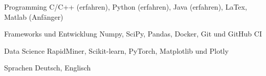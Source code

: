 

\begin{cvskills}

  \cvskill
    {Programming} %
    {C/C++ (erfahren), Python (erfahren), Java (erfahren), LaTex, Matlab (Anfänger) } %

  \cvskill
    {Frameworks und Entwicklung} %
    {Numpy, SciPy, Pandas, Docker, Git und GitHub CI} %

  \cvskill
    {Data Science} %
    {RapidMiner, Scikit-learn, PyTorch, Matplotlib und Plotly} %

  \cvskill
    {Sprachen} %
    {Deutsch, Englisch} %

\end{cvskills}
